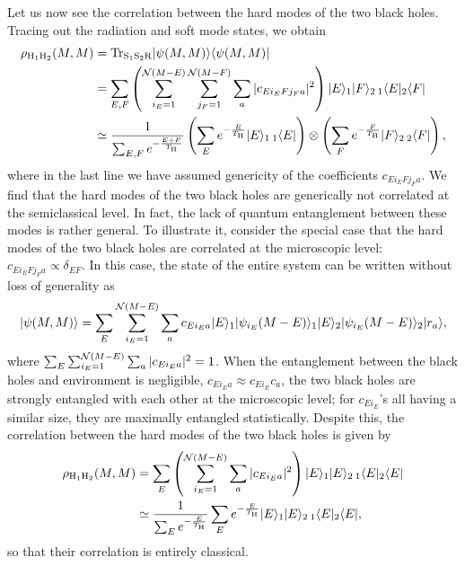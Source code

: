 \documentclass[12pt]{article}
\begin{document}
Let us now see the correlation between the hard modes of the two 
black holes.  Tracing out the radiation and soft mode states, we 
obtain
%
\begin{align}
  \rho_{{\rm H}_1 {\rm H}_2}(M,M) 
  &= {\rm Tr}_{{\rm S}_1 {\rm S}_2 {\rm R}} 
    \ket{\psi(M,M)} \bra{\psi(M,M)} 
\nonumber\\
  &= \sum_{E,F} \left( \sum_{i_E = 1}^{{\cal N}(M-E)} 
    \sum_{j_F = 1}^{{\cal N}(M-F)} \sum_a 
    |c_{E i_E F j_F a}|^2 \right) 
    \ket{E}_1 \ket{F}_2\, {}_1\bra{E} {}_2\bra{F} 
\nonumber\\
  &\simeq \frac{1}{\sum_{E,F} e^{-\frac{E+F}{T_{\rm H}}}} 
    \left( \sum_E e^{-\frac{E}{T_{\rm H}}} 
      \ket{E}_1\, {}_1\bra{E} \right) \otimes 
    \left( \sum_F e^{-\frac{F}{T_{\rm H}}} 
      \ket{F}_2\, {}_2\bra{F} \right),
\label{eq:rho_H1H2}
\end{align}
%
where in the last line we have assumed genericity of the 
coefficients $c_{E i_E F j_F a}$.  We find that the hard modes 
of the two black holes are generically not correlated at the 
semiclassical level.  In fact, the lack of quantum entanglement 
between these modes is rather general.  To illustrate it, 
consider the special case that the hard modes of the two black 
holes are correlated at the microscopic level:\ $c_{E i_E F j_F a} 
\propto \delta_{E F}$.  In this case, the state of the entire 
system can be written without loss of generality as
%
\begin{equation}
  \ket{\psi(M,M)} = \sum_E \sum_{i_E = 1}^{{\cal N}(M-E)} \sum_a 
    c_{E i_E a} \ket{E}_1 \ket{\psi_{i_E}(M-E)}_1 
    \ket{E}_2 \ket{\psi_{i_E}(M-E)}_2 \ket{r_a},
\label{eq:BH-pair}
\end{equation}
%
where $\sum_E \sum_{i_E = 1}^{{\cal N}(M-E)} \sum_a |c_{E i_E a}|^2 
= 1$.  When the entanglement between the black holes and environment 
is negligible, $c_{E i_E a} \approx c_{E i_E} c_a$, the two black 
holes are strongly entangled with each other at the microscopic 
level; for $c_{E i_E}$'s all having a similar size, they are 
maximally entangled statistically.  Despite this, the correlation 
between the hard modes of the two black holes is given by
%
\begin{align}
  \rho_{{\rm H}_1 {\rm H}_2}(M,M) 
  &= \sum_E \left( \sum_{i_E = 1}^{{\cal N}(M-E)} \sum_a 
    |c_{E i_E a}|^2 \right) \ket{E}_1 \ket{E}_2\, 
    {}_1\bra{E} {}_2\bra{E} 
\nonumber\\
  &\simeq \frac{1}{\sum_E e^{-\frac{E}{T_{\rm H}}}} 
    \sum_E e^{-\frac{E}{T_{\rm H}}} 
    \ket{E}_1 \ket{E}_2\, {}_1\bra{E} {}_2\bra{E},
\label{eq:rho_H1H2-sp}
\end{align}
%
so that their correlation is entirely classical.
\end{document}
